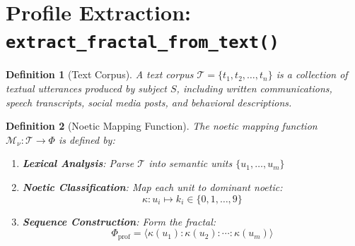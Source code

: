 \documentclass[11pt,twoside]{book}
\newcommand{\Frac}{\Phi}
\newcommand{\ProfileFrac}{\Phi_{\mathrm{prof}}}
\newcommand{\TextCorpus}{\mathcal{T}}
\newcommand{\NoetMap}{\mathcal{M}_\nu}
\newtheorem{definition}{Definition}[chapter]
\begin{document}
\section{Profile Extraction: \texttt{extract\_fractal\_from\_text()}}

\begin{definition}[Text Corpus]
\label{def:text-corpus}
A \emph{text corpus} $\TextCorpus = \{t_1, t_2, \ldots, t_n\}$ is a collection of textual
utterances produced by subject $S$, including written communications, speech transcripts,
social media posts, and behavioral descriptions.
\end{definition}

\begin{definition}[Noetic Mapping Function]
\label{def:noetic-mapping}
The \emph{noetic mapping function} $\NoetMap : \TextCorpus \to \Frac$ is defined by:
\begin{enumerate}[label=(\roman*)]
    \item \textbf{Lexical Analysis}: Parse $\TextCorpus$ into semantic units $\{u_1, \ldots, u_m\}$
    \item \textbf{Noetic Classification}: Map each unit to dominant noetic:
    \[
        \kappa : u_i \mapsto k_i \in \{0, 1, \ldots, 9\}
    \]
    \item \textbf{Sequence Construction}: Form the fractal:
    \[
        \ProfileFrac = \langle \kappa(u_1) : \kappa(u_2) : \cdots : \kappa(u_m) \rangle
    \]
\end{enumerate}
\end{definition}
\end{document}
